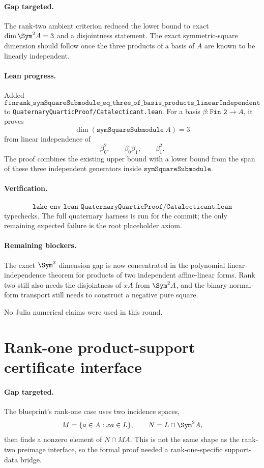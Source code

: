 \documentclass[11pt]{article}
\begin{document}
\paragraph{Gap targeted.}
The rank-two ambient criterion reduced the lower bound to exact
\(\dim\Sym^2 A=3\) and a disjointness statement.  The exact symmetric-square
dimension should follow once the three products of a basis of \(A\) are known
to be linearly independent.

\paragraph{Lean progress.}
Added
\[
\texttt{finrank\_symSquareSubmodule\_eq\_three\_of\_basis\_products\_linearIndependent}
\]
to \texttt{QuaternaryQuarticProof/Catalecticant.lean}.  For a basis
\(\beta:\texttt{Fin 2}\to A\), it proves
\[
\dim(\texttt{symSquareSubmodule}\ A)=3
\]
from linear independence of
\[
\beta_0^2,\qquad \beta_0\beta_1,\qquad \beta_1^2.
\]
The proof combines the existing upper bound with a lower bound from the span
of these three independent generators inside \(\texttt{symSquareSubmodule}\).

\paragraph{Verification.}
\[
\texttt{lake env lean QuaternaryQuarticProof/Catalecticant.lean}
\]
typechecks.  The full quaternary harness is run for the commit; the only
remaining expected failure is the root placeholder axiom.

\paragraph{Remaining blockers.}
The exact \(\Sym^2\) dimension gap is now concentrated in the polynomial
linear-independence theorem for products of two independent affine-linear
forms.  Rank two still also needs the disjointness of \(xA\) from
\(\Sym^2 A\), and the binary normal-form transport still needs to construct a
negative pure square.

No Julia numerical claims were used in this round.

\section*{Rank-one product-support certificate interface}

\paragraph{Gap targeted.}
The blueprint's rank-one case uses two incidence spaces,
\[
M=\{a\in A: xa\in L\},\qquad N=L\cap\Sym^2A,
\]
then finds a nonzero element of \(N\cap MA\).  This is not the same shape as
the rank-two preimage interface, so the formal proof needed a rank-one-specific
support-data bridge.
\end{document}
